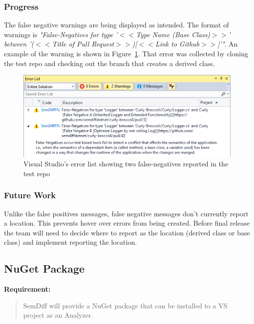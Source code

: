 \documentclass[draftclsnofoot,onecolumn]{IEEEtran}
\begin{document}
\subsubsection{Progress}

The false negative warnings are being displayed as intended. The format of 
warnings is \textit{"False-Negatives for type '$<<$Type Name (Base 
Class)$>>$' between '($<<$Title of Pull Request$>>$)[$<<$Link to 
Github$>>$]'"}. An example of the warning is shown in Figure~\ref{fnerrorlist}. 
That error was collected by cloning the test repo and checking out the branch 
that creates a derived class.

\begin{figure}[!htb]
\centering
\includegraphics[scale=1]{FalseNegativeErrorList}
\caption{Visual Studio's error list showing two false-negatives reported in 
the test repo}
\label{fnerrorlist}
\end{figure}

\subsubsection{Future Work}

Unlike the false positives messages, false negative messages don’t currently 
report a location. This prevents hover over errors from being created. Before 
final release the team will need to decide where to report as the location 
(derived class or base class) and implement reporting the location.

\subsection{NuGet Package}%

\textbf{Requirement:}

\begin{quote}

SemDiff will provide a NuGet package that can be installed to a VS project as 
an Analyzer.

\end{quote}
\end{document}
